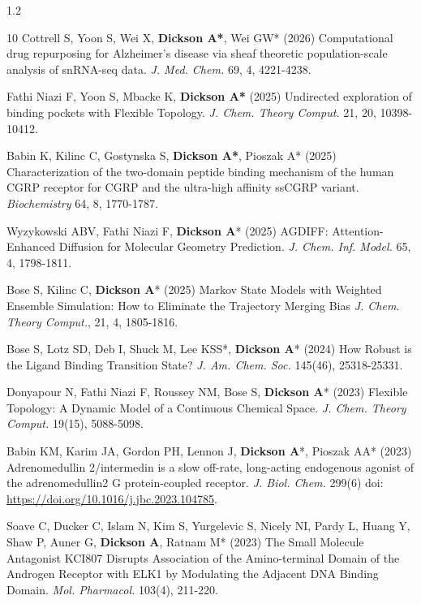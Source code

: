 \documentclass[margin,line]{res}
\begin{document}
\begin{resume}
\begin{spacing}{1.2}
\begin{thebibliography}{10}
  Cottrell S, Yoon S, Wei X, {\bf Dickson A*}, Wei GW* (2026) Computational drug repurposing for Alzheimer's disease via sheaf theoretic population-scale analysis of snRNA-seq data.
  \newblock \textit{J. Med. Chem.} 69, 4, 4221-4238.

  Fathi Niazi F, Yoon S, Mbacke K, {\bf Dickson A*} (2025) Undirected exploration of binding pockets with Flexible Topology.
  \newblock \textit{J. Chem. Theory Comput.} 21, 20, 10398-10412.
  
  Babin K, Kilinc C, Gostynska S, {\bf Dickson A*}, Pioszak A* (2025) Characterization of the two-domain peptide binding mechanism of the human CGRP receptor for CGRP and the ultra-high affinity ssCGRP variant.
  \newblock \textit{Biochemistry} 64, 8, 1770-1787.

  Wyzykowski ABV, Fathi Niazi F, {\bf Dickson A}* (2025) AGDIFF: Attention-Enhanced Diffusion for Molecular Geometry Prediction.
  \newblock \textit{J. Chem. Inf. Model.} 65, 4, 1798-1811.

  Bose S, Kilinc C, {\bf Dickson A}* (2025) Markov State Models with Weighted Ensemble Simulation: How to Eliminate the Trajectory Merging Bias 
  \newblock \textit{J. Chem. Theory Comput.}, 21, 4, 1805-1816.

  Bose S, Lotz SD, Deb I, Shuck M, Lee KSS*, {\bf Dickson A}* (2024) How Robust is the Ligand Binding Transition State?
  \newblock \textit{J. Am. Chem. Soc.} 145(46), 25318-25331. 

  Donyapour N, Fathi Niazi F, Roussey NM, Bose S, {\bf Dickson A}* (2023) Flexible Topology: A Dynamic Model of a Continuous Chemical Space.
  \newblock \textit{J. Chem. Theory Comput.} 19(15), 5088-5098. 

  Babin KM, Karim JA, Gordon PH, Lennon J, {\bf Dickson A}*, Pioszak AA* (2023) Adrenomedullin 2/intermedin is a slow off-rate, long-acting endogenous agonist of the adrenomedullin2 G protein-coupled receptor.
  \newblock \textit{J. Biol. Chem.} 299(6) doi: \url{https://doi.org/10.1016/j.jbc.2023.104785}.

  Soave C, Ducker C, Islam N, Kim S, Yurgelevic S, Nicely NI, Pardy L, Huang Y, Shaw P, Auner G, {\bf Dickson A}, Ratnam M* (2023) The Small Molecule Antagonist KCI807 Disrupts Association of the Amino-terminal Domain of the Androgen Receptor with ELK1 by Modulating the Adjacent DNA Binding Domain.
  \newblock \textit{Mol. Pharmacol.} 103(4), 211-220. 


\end{thebibliography}
\end{spacing}
\end{resume}
\end{document}
